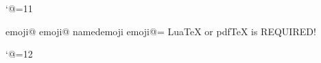 
\catcode`@=11

\ifdefined\directlua
    
\fi

\ifdefined\pdftexversion
    \def\unemoji@print#1#2{%
        \ifcsname emoji@#2\endcsname%
            \pdfrefximage\csname emoji@#2\endcsname\relax%
        \else%
            \pdfximage named{emoji#2}{#1}%
            \expandafter\chardef\csname emoji@#2\endcsname=\pdflastximage\relax%
            \pdfrefximage\pdflastximage\relax%
        \fi%
    }
\fi

\ifx\unemoji@print\undefined
    \errmessage{%
        LuaTeX or pdfTeX is REQUIRED!%
    }
\fi

\def\emojifont{noto-emoji.pdf}

\def\emoji#1{%
    \unemoji@print{\emojifont}{#1}%
}

\catcode`@=12
\endinput
